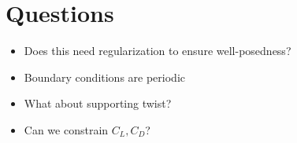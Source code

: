 \documentclass{article}
\begin{document}

\section{Questions}

\begin{itemize}
 \item Does this need regularization to ensure well-posedness?
 \item Boundary conditions are periodic
 \item What about supporting twist?
 \item Can we constrain $C_L, C_D$?
\end{itemize}
\end{document}
